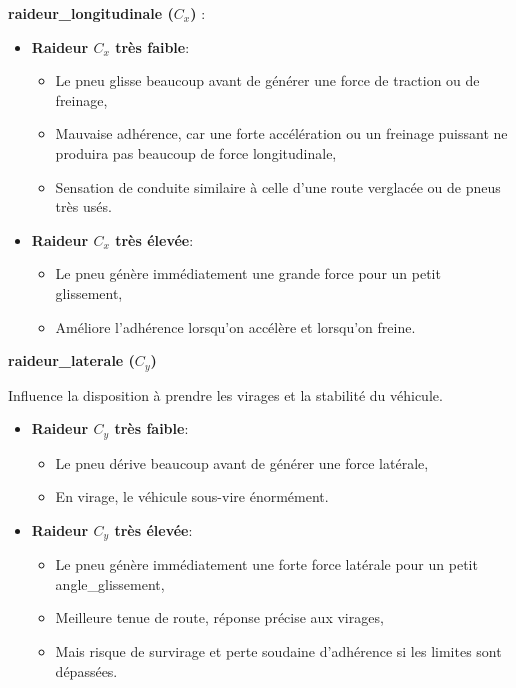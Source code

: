 \textbf{\gls{raideur_longitudinale} ($C_x$) }:
\begin{itemize}
    \item \textbf{Raideur $C_x$ très faible}:
    \begin{itemize}[label=$\star$]
        \item Le pneu glisse beaucoup avant de générer une force de traction ou de freinage,
        \item Mauvaise adhérence, car une forte accélération ou un freinage puissant ne produira pas beaucoup de force longitudinale,
        \item Sensation de conduite similaire à celle d’une route verglacée ou de pneus très usés.
    \end{itemize}

    \item \textbf{Raideur $C_x$ très élevée}:
    \begin{itemize}[label=$\star$]
        \item Le pneu génère immédiatement une grande force pour un petit glissement,
        \item Améliore l’adhérence lorsqu'on accélère et lorsqu'on freine.
    \end{itemize}
\end{itemize}

\textbf{\gls{raideur_laterale} ($C_y$)}

Influence la disposition à prendre les virages et la stabilité du véhicule.

\begin{itemize}
    \item \textbf{Raideur $C_y$ très faible}:
    \begin{itemize}[label=$\star$]
        \item Le pneu dérive beaucoup avant de générer une force latérale,
        \item En virage, le véhicule sous-vire énormément.
    \end{itemize}

    \item \textbf{Raideur $C_y$ très élevée}:
    \begin{itemize}[label=$\star$]
        \item Le pneu génère immédiatement une forte force latérale pour un petit \gls{angle_glissement},
        \item Meilleure tenue de route, réponse précise aux virages,
        \item Mais risque de \gls{survirage} et perte soudaine d’adhérence si les limites sont dépassées.
    \end{itemize}
\end{itemize}

